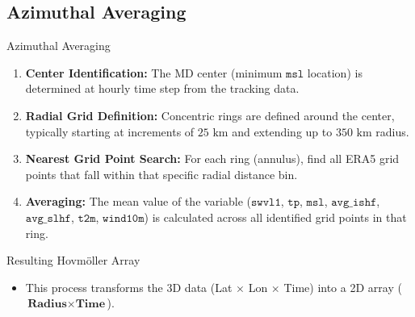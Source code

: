 \documentclass[aspectratio=169,t,xcolor=table]{beamer}
\begin{document}
\subsection{Azimuthal Averaging}
\begin{frame}{Azimuthal Averaging}
	\vspace{-0.2cm}
	\footnotesize
	\begin{enumerate}
		\item \textbf{Center Identification:} The MD center (minimum $\texttt{msl}$ location) is determined at hourly time step from the tracking data.
		\item \textbf{Radial Grid Definition:} Concentric rings are defined around the center, typically starting at increments of $25 \text{ km}$ and extending up to $350 \text{ km}$ radius.
		\item \textbf{Nearest Grid Point Search:} For each ring (annulus), find all ERA5 grid points that fall within that specific radial distance bin.
		\item \textbf{Averaging:} The mean value of the variable ($\texttt{swvl1}$, $\texttt{tp}$, $\texttt{msl}$, $\texttt{avg\_ishf}$, $\texttt{avg\_slhf}$, $\texttt{t2m}$, $\texttt{wind10m}$) is calculated across all identified grid points in that ring.
	\end{enumerate}

	\vspace{-1cm}

	\footnotesize
	\begin{alertblock}{\small Resulting Hovm\"oller Array}
		\begin{itemize}
			\item This process transforms the 3D data (Lat $\times$ Lon $\times$ Time) into a 2D array ($\textbf{Radius} \times \textbf{Time}$).
		\end{itemize}
	\end{alertblock}
\end{frame}
\end{document}
